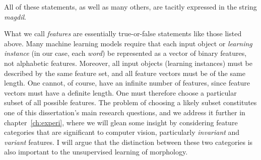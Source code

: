 All of these statements, as well as many others,
are tacitly expressed in the string \textit{magdil}.

What we call \emph{features} are essentially true-or-false statements like those listed above.
Many machine learning models require that each input object or \emph{learning instance} 
(in our case, each \emph{word}) be represented as a vector of binary features, not alphabetic 
features. Moreover, all input objects (learning instances) must be described by the same feature 
set, and all feature vectors must be of the same length.
One cannot, of course, have an infinite number of features, since feature vectors must have a definite length.
One must therefore choose a particular subset of all possible features. The problem of choosing a likely subset constitutes one of
this dissertation's main research questions, and we
address it further in chapter~\ref{ch:experi}, where we will glean some insight 
by considering feature categories that 
are significant to computer vision, particularly \emph{invariant} and \emph{variant} features. I will argue that the distinction between these two categories is also important to the unsupervised learning of morphology.


